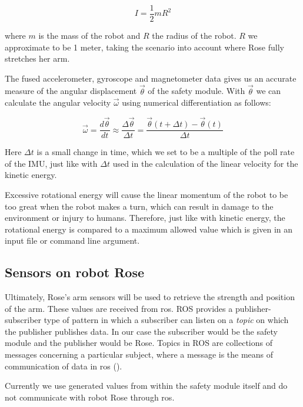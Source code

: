 \documentclass[12pt]{scrreprt}
\begin{document}
\begin{equation}
    I = \frac{1}{2}mR^2
\end{equation}

where $m$ is the mass of the robot and $R$ the radius of the robot. $R$ we approximate to be 1 meter, taking the scenario into account where Rose fully stretches her arm.
\par
The fused accelerometer, gyroscope and magnetometer data gives us an accurate measure of the angular displacement $\vec{\theta}$ of the safety module. With $\vec{\theta}$ we can calculate the angular velocity $\vec{\omega}$ using numerical differentiation as follows:

\begin{equation}
    \vec{\omega} = \frac{d\vec{\theta}}{dt} \approx \frac{\Delta\vec{\theta}}{\Delta t} = \frac{\vec{\theta}(t + \Delta t ) - \vec{\theta}(t)}{\Delta t}
\end{equation}

Here $\Delta t$ is a small change in time, which we set to be a multiple of the poll rate of the IMU, just like with $\Delta t$ used in the calculation of the linear velocity for the kinetic energy.
\par
Excessive rotational energy will cause the linear momentum of the robot to be too great when the robot makes a turn, which can result in damage to the environment or injury to humans. Therefore, just like with kinetic energy, the rotational energy is compared to a maximum allowed value which is given in an input file or command line argument.

\subsection{Sensors on robot Rose}
Ultimately, Rose's arm sensors will be used to retrieve the strength and position of the arm. These values are received from \acrshort{ros}. ROS provides a publisher-subscriber type of pattern in which a subscriber can listen on a \textit{topic} on which the publisher publishes data. In our case the subscriber would be the safety module and the publisher would be Rose. Topics in ROS are collections of messages concerning a particular subject, where a message is the means of communication of data in \acrshort{ros} (\cite{agitr}).
\par
Currently we use generated values from within the safety module itself and do not communicate with robot Rose through \acrshort{ros}.
\end{document}
